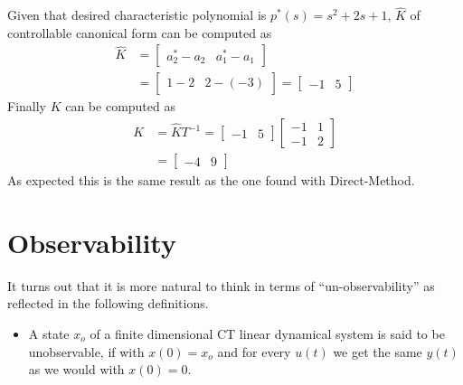\documentclass[twoside]{article}
\begin{document}
%
Given that desired characteristic polynomial is $p^*(s) = s^2 + 2 s + 1$,
$\hat{K}$ of controllable canonical form can be computed as
%
\begin{align*}
  \hat{K} &= \left[ \begin{array}{cc} a_2^* - a_2 & a_1^* - a_1 \end{array}
                                                       \right]
\\
&= \left[ \begin{array}{ccc} 1-2 & 2-(-3) \end{array}
                                                       \right]
= \left[ \begin{array}{ccc} -1 & 5 \end{array}
                                                       \right]
\end{align*}
%
Finally $K$ can be computed as
%
\begin{align*}
  K &= \hat{K} T^{-1} = \left[ \begin{array}{ccc} -1 & 5 \end{array}
                                                       \right]
\left[ \begin{array}{cc} -1 & 1 \\ -1 & 2 \end{array} \right]
\\
&= \left[ \begin{array}{ccc} -4 & 9 \end{array}
                                                       \right]
\end{align*}
%
As expected this is the same result as the one found with Direct-Method.

\newpage

\section{Observability}

It turns out that it is more natural to think in terms of
``un-observability'' as reflected in the following definitions.

\begin{itemize}
  \item A state $x_o$ of a finite dimensional CT linear dynamical
    system is said to be unobservable, if with $x(0) = x_o$ and
    for every $u(t)$ we get the same $y(t)$ as we would with $x(0) =
    0$. 
\end{itemize}
\end{document}
